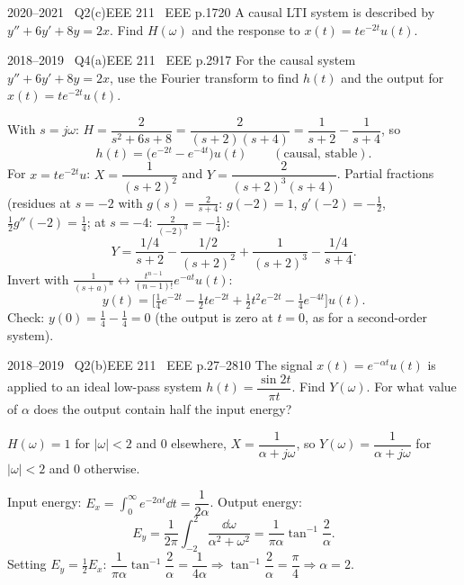 \begin{qcard}{2020--2021 \textbullet\ Q2(c)}{EEE 211 \textbullet\ EEE p.17}{20}
A causal LTI system is described by $y''+6y'+8y=2x$. Find $H(\omega)$ and the response to $x(t)=te^{-2t}u(t)$.
\end{qcard}
\begin{qcard}{2018--2019 \textbullet\ Q4(a)}{EEE 211 \textbullet\ EEE p.29}{17}
For the causal system $y''+6y'+8y=2x$, use the Fourier transform to find $h(t)$ and the output for $x(t)=te^{-2t}u(t)$.
\end{qcard}
\begin{solution}
With $s=j\omega$: $H=\dfrac{2}{s^2+6s+8}=\dfrac2{(s+2)(s+4)}=\dfrac1{s+2}-\dfrac1{s+4}$, so
\[h(t)=\big(e^{-2t}-e^{-4t}\big)u(t)\qquad(\text{causal, stable}).\]
For $x=te^{-2t}u$: $X=\dfrac1{(s+2)^2}$ and $Y=\dfrac{2}{(s+2)^3(s+4)}$. Partial fractions (residues at $s=-2$ with $g(s)=\frac2{s+4}$: $g(-2)=1$, $g'(-2)=-\frac12$, $\frac12g''(-2)=\frac14$; at $s=-4$: $\frac2{(-2)^3}=-\frac14$):
\[Y=\frac{1/4}{s+2}-\frac{1/2}{(s+2)^2}+\frac1{(s+2)^3}-\frac{1/4}{s+4}.\]
Invert with $\frac1{(s+a)^n}\leftrightarrow\frac{t^{n-1}}{(n-1)!}e^{-at}u(t)$:
\[y(t)=\Big[\tfrac14e^{-2t}-\tfrac12te^{-2t}+\tfrac12t^2e^{-2t}-\tfrac14e^{-4t}\Big]u(t).\]
Check: $y(0)=\frac14-\frac14=0$ (the output is zero at $t=0$, as for a second-order system).
\end{solution}

\begin{qcard}{2018--2019 \textbullet\ Q2(b)}{EEE 211 \textbullet\ EEE p.27--28}{10}
The signal $x(t)=e^{-\alpha t}u(t)$ is applied to an ideal low-pass system $h(t)=\dfrac{\sin2t}{\pi t}$. Find $Y(\omega)$. For what value of $\alpha$ does the output contain half the input energy?
\end{qcard}
\begin{solution}
$H(\omega)=1$ for $|\omega|<2$ and $0$ elsewhere, $X=\dfrac1{\alpha+j\omega}$, so $Y(\omega)=\dfrac1{\alpha+j\omega}$ for $|\omega|<2$ and $0$ otherwise.

Input energy: $E_x=\int_0^\infty e^{-2\alpha t}\dd t=\dfrac1{2\alpha}$. Output energy:
\[E_y=\frac1{2\pi}\int_{-2}^{2}\frac{\dd\omega}{\alpha^2+\omega^2}=\frac1{\pi\alpha}\tan^{-1}\frac2\alpha .\]
Setting $E_y=\frac12E_x$: $\dfrac1{\pi\alpha}\tan^{-1}\dfrac2\alpha=\dfrac1{4\alpha}\Rightarrow\tan^{-1}\dfrac2\alpha=\dfrac\pi4\Rightarrow\alpha=2$.
\end{solution}

